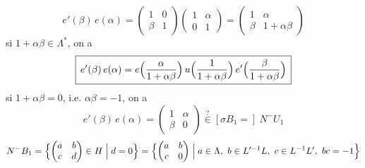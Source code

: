 \documentclass[11pt,a4paper]{article}
\begin{document}
\[
e'(\beta)\, e(\alpha) = \begin{pmatrix} 1 & 0 \\ \beta & 1 \end{pmatrix} \begin{pmatrix} 1 & \alpha \\ 0 & 1 \end{pmatrix}
= \begin{pmatrix} 1 & \alpha \\ \beta & 1 + \alpha\beta \end{pmatrix}
\]
si $1 + \alpha\beta \in \Lambda^*$, on a
\[
\boxed{\, e'(\beta)\, e(\alpha) = e\Bigl(\frac{\alpha}{1 + \alpha\beta}\Bigr)\, u\Bigl(\frac{1}{1 + \alpha\beta}\Bigr)\, e'\Bigl(\frac{\beta}{1 + \alpha\beta}\Bigr) \,}
\]
si $1 + \alpha\beta = 0$, i.e. $\alpha\beta = -1$, on a
\[
e'(\beta)\, e(\alpha) = \begin{pmatrix} 1 & \alpha \\ \beta & 0 \end{pmatrix} \overset{?}{\in} [\sigma B_1 =]\ N^- U_1
\]
\[
N^- B_1 = \Bigl\{ \begin{pmatrix} a & b \\ c & d \end{pmatrix} \in H \Bigm| d = 0 \Bigr\}
= \Bigl\{ \begin{pmatrix} a & b \\ c & 0 \end{pmatrix} \Bigm| a \in \Lambda,\ b \in L'^{-1}L,\ c \in L^{-1}L',\ bc = -1 \Bigr\}
\]
\end{document}

